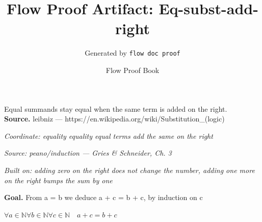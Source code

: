 \documentclass[11pt]{article}
\title{Flow Proof Artifact: Eq-subst-add-right}
\author{Generated by \texttt{flow doc proof}}
\date{Flow Proof Book}
\theoremstyle{definition}
\begin{document}
\maketitle
Equal summands stay equal when the same term is added on the right.\\[0.5em]
\textbf{Source.} leibniz — https://en.wikipedia.org/wiki/Substitution\_(logic)\\[0.5em]
\bigskip
{}\par
\smallskip\noindent\textit{Coordinate: equality \cdot equality \cdot equal terms add the same on the right}\par
\smallskip\noindent\textit{Source: peano/induction — Gries \& Schneider, Ch. 3}\par
\smallskip\noindent\textit{Built on: adding zero on the right does not change the number, adding one more on the right bumps the sum by one}\par
\medskip
\noindent\textbf{Goal.} From a = b we deduce a + c = b + c, by induction on c\par
\noindent$\displaystyle \forall a \in \mathbb{N} \forall b \in \mathbb{N} \forall c \in \mathbb{N}\quad a + c = b + c$\par
\medskip
\noindent
\end{document}
